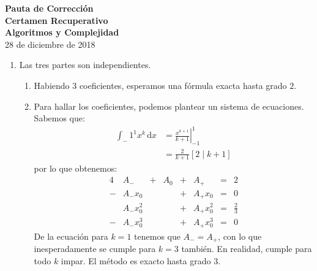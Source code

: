 \documentclass[english, spanish, fleqn]{article}
\begin{document}
\thispagestyle{empty}
  \begin{center}
    {\huge\textbf{Pauta de Corrección\\[0.4\baselineskip]
		  Certamen Recuperativo\\[0.3\baselineskip]
		  Algoritmos y Complejidad}}\\
    \vspace{2ex}
    {\large 28 de diciembre de 2018}
  \end{center}
  \vspace{5mm}

  \begin{enumerate}
  \item %
    Las tres partes son independientes.
    \begin{enumerate}
    \item %
      Habiendo \(3\) coeficientes,
      esperamos una fórmula exacta hasta grado \(2\).
    \item %
      Para hallar los coeficientes,
      podemos plantear un sistema de ecuaciones.
      Sabemos que:
      \begin{align*}
        \int_-1^1 x^k \, \mathrm{d} x
          &= \left. \frac{x^{k + 1}}{k + 1} \right|_{-1}^1 \\
          &= \frac{2}{k + 1} [ 2 \mid k + 1 ]
      \end{align*}
      por lo que obtenemos:
      \begin{alignat*}{4}
        &A_{-}       &+& A_0 &+& A_{+}       &=& 2 \\
       -&A_{-} x_0   &&      &+& A_{+} x_0   &=& 0 \\
        &A_{-} x_0^2 &&      &+& A_{+} x_0^2 &=& \frac{2}{3} \\
       -&A_{-} x_0^3 &&      &+& A_{+} x_0^3 &=& 0
      \end{alignat*}
      De la ecuación para \(k = 1\) tenemos que \(A_{-} = A_{+}\),
      con lo que inesperadamente se cumple para \(k = 3\) también.
      En realidad,
      cumple para todo \(k\) impar.
      El método es exacto hasta grado \(3\).


\end{enumerate}
\end{enumerate}
\end{document}
